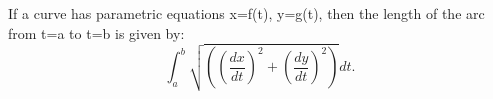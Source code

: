  If a curve has parametric equations x=f(t), y=g(t), then the
length of the arc from t=a to t=b is given by:
\[ \int _a ^b  \sqrt{ \left ( \left ( \frac{dx}{dt} \right ) ^2
+ \left ( \frac{dy}{dt} \right ) ^2 \right )  } dt . \]
